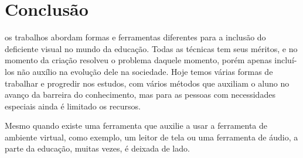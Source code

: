 \documentclass[12pt,journal,compsoc]{IEEEtran}
\begin{document}
\section{Conclusão}
 os trabalhos abordam formas e ferramentas diferentes para a inclusão do deficiente visual no mundo da educação. 
Todas as técnicas tem seus méritos, e no momento da criação resolveu o problema daquele momento, porém apenas incluí-los 
não auxílio na evolução dele na sociedade. Hoje temos várias formas de trabalhar e progredir nos estudos, com vários métodos 
que auxiliam o aluno no avanço da barreira do conhecimento, mas para as pessoas com necessidades especiais ainda é limitado 
os recursos.

Mesmo quando existe uma ferramenta que auxilie a usar a ferramenta de ambiente virtual, como exemplo, um leitor de 
tela ou uma ferramenta de áudio, a parte da educação, muitas vezes, é deixada de lado.

\ifCLASSOPTIONcaptionsoff
  \newpage
\fi




\end{document}
